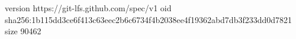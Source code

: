 version https://git-lfs.github.com/spec/v1
oid sha256:1b115dd3ce6f413c63eec2b6c6734f4b2038ee4f19362abd7db3f233dd0d7821
size 90462
